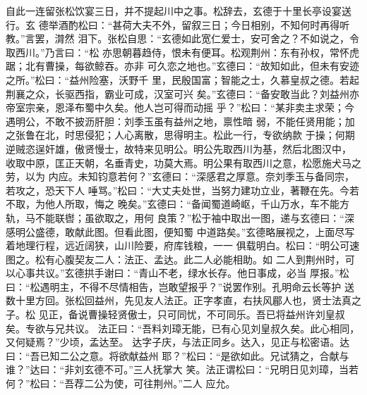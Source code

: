 自此一连留张松饮宴三日，并不提起川中之事。松辞去，玄德于十里长亭设宴送行。玄
德举酒酌松曰：“甚荷大夫不外，留叙三日；今日相别，不知何时再得听教。”言罢，潸然
泪下。张松自思：“玄德如此宽仁爱士，安可舍之？不如说之，令取西川。”乃言曰：“松
亦思朝暮趋侍，恨未有便耳。松观荆州：东有孙权，常怀虎踞；北有曹操，每欲鲸吞。亦非
可久恋之地也。”玄德曰：“故知如此，但未有安迹之所。”松曰：“益州险塞，沃野千
里，民殷国富；智能之士，久慕皇叔之德。若起荆襄之众，长驱西指，霸业可成，汉室可兴
矣。”玄德曰：“备安敢当此？刘益州亦帝室宗亲，恩泽布蜀中久矣。他人岂可得而动摇
乎？”松曰：“某非卖主求荣；今遇明公，不敢不披沥肝胆：刘季玉虽有益州之地，禀性暗
弱，不能任贤用能；加之张鲁在北，时思侵犯；人心离散，思得明主。松此一行，专欲纳款
于操；何期逆贼恣逞奸雄，傲贤慢士，故特来见明公。明公先取西川为基，然后北图汉中，
收取中原，匡正天朝，名垂青史，功莫大焉。明公果有取西川之意，松愿施犬马之劳，以为
内应。未知钧意若何？”玄德曰：“深感君之厚意。奈刘季玉与备同宗，若攻之，恐天下人
唾骂。”松曰：“大丈夫处世，当努力建功立业，著鞭在先。今若不取，为他人所取，悔之
晚矣。”玄德曰：“备闻蜀道崎岖，千山万水，车不能方轨，马不能联辔；虽欲取之，用何
良策？”松于袖中取出一图，递与玄德曰：“深感明公盛德，敢献此图。但看此图，便知蜀
中道路矣。”玄德略展视之，上面尽写着地理行程，远近阔狭，山川险要，府库钱粮，一一
俱载明白。松曰：“明公可速图之。松有心腹契友二人：法正、孟达。此二人必能相助。如
二人到荆州时，可以心事共议。”玄德拱手谢曰：“青山不老，绿水长存。他日事成，必当
厚报。”松曰：“松遇明主，不得不尽情相告，岂敢望报乎？”说罢作别。孔明命云长等护
送数十里方回。张松回益州，先见友人法正。正字孝直，右扶风郿人也，贤士法真之子。松
见正，备说曹操轻贤傲士，只可同忧，不可同乐。吾已将益州许刘皇叔矣。专欲与兄共议。
法正曰：“吾料刘璋无能，已有心见刘皇叔久矣。此心相同，又何疑焉？”少顷，孟达至。
达字子庆，与法正同乡。达入，见正与松密语。达曰：“吾已知二公之意。将欲献益州
耶？”松曰：“是欲如此。兄试猜之，合献与谁？”达曰：“非刘玄德不可。”三人抚掌大
笑。法正谓松曰：“兄明日见刘璋，当若何？”松曰：“吾荐二公为使，可往荆州。”二人
应允。

